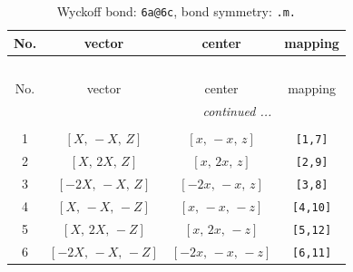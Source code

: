 \documentclass[fleqn,8pt]{jsarticle}
\begin{document}
\begin{longtable}{cccc}
\caption{Wyckoff bond: {\tt 6a@6c}, bond symmetry: {\tt .m.}}
 \\
 \hline \hline
No. & vector & center & mapping \\ \hline \endfirsthead

\multicolumn{3}{l}{\tablename\ \thetable{}} \\
 \hline \hline
No. & vector & center & mapping \\ \hline \endhead

 \hline \hline
\multicolumn{3}{r}{\footnotesize\it continued ...} \\ \endfoot

 \hline \hline
\multicolumn{3}{r}{} \\ \endlastfoot

1 & $\left[ X,\, - X,\, Z \right]$ & $\left[ x,\, - x,\, z \right]$ & {\tt [1,7]} \\ \hline
2 & $\left[ X,\, 2 X,\, Z \right]$ & $\left[ x,\, 2 x,\, z \right]$ & {\tt [2,9]} \\ \hline
3 & $\left[ - 2 X,\, - X,\, Z \right]$ & $\left[ - 2 x,\, - x,\, z \right]$ & {\tt [3,8]} \\ \hline
4 & $\left[ X,\, - X,\, - Z \right]$ & $\left[ x,\, - x,\, - z \right]$ & {\tt [4,10]} \\ \hline
5 & $\left[ X,\, 2 X,\, - Z \right]$ & $\left[ x,\, 2 x,\, - z \right]$ & {\tt [5,12]} \\ \hline
6 & $\left[ - 2 X,\, - X,\, - Z \right]$ & $\left[ - 2 x,\, - x,\, - z \right]$ & {\tt [6,11]} \\
\end{longtable}
\renewcommand{\arraystretch}{1.2}
\end{document}
